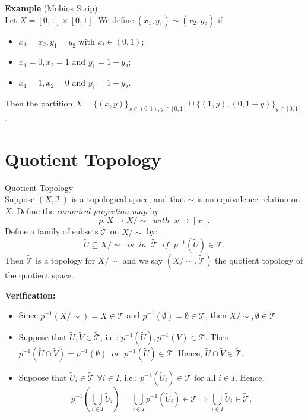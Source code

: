\noindent \textbf{Example} (Mobius Strip):\\
Let $X = [0,1] \times [0,1]$. We define $(x_1,y_1) \sim (x_2,y_2)$ if
\begin{itemize}
    \item $x_1 = x_2, y_1 =y_2$ with $x_i \in (0,1)$;
    \item $x_1 = 0, x_2 = 1$ and $y_1 = 1-y_2$;
    \item $x_1 = 1,x_2=0$ and $y_1=1-y_2$.
\end{itemize}
Then the partition $X = \{ (x,y) \}_{x \in (0,1), y\in [0,1]} \cup \{ (1,y), (0,1-y) \}_{y\in [0,1]}$.

\section{Quotient Topology}

\begin{definition}{Quotient Topology}\\
Suppose $(X,\mathcal{T})$ is a topological space, and that $\sim$ is an equivalence relation on $X$. Define the \textit{canonical projection map} by 
$$p: X\rightarrow X/\sim \;\; with \;\; x \mapsto [x].$$
Define a family of subsets $\widetilde{\mathcal{T}}$ on $X/\sim$ by:
$$\widetilde{U} \subseteq X/\sim \;\; is \;\; in \;\; \widetilde{\mathcal{T}} \;\; if \;\; p^{-1} (\widetilde{U}) \in \mathcal{T}.$$
Then $\widetilde{\mathcal{T}}$ is a topology for $X/\sim$ and we say $(X/\sim,\widetilde{\mathcal{T}})$ the quotient topology of the quotient space.
\end{definition}

\noindent\textbf{Verification:}
\begin{itemize}
    \item Since $p^{-1}(X/\sim) = X \in \mathcal{T}$ and $p^{-1} ( \emptyset) =\emptyset \in \mathcal{T}$, then $X/\sim ,\emptyset \in \widetilde{\mathcal{T}}$.
    \item Suppose that $\widetilde{U} , \widetilde{V}\in \widetilde{\mathcal{T}}$, i.e.: $p^{-1}(\widetilde{U}), p^{-1}(V) \in \mathcal{T}$. 
    Then $p^{-1} (\widetilde{U} \cap \widetilde{V}) = p^{-1} ( \emptyset) \;\; or \;\; p^{-1}(\widetilde{U}) \in \mathcal{T}$. 
    Hence, $\widetilde{U} \cap \widetilde{V} \in \widetilde{\mathcal{T}}$.
    \item Suppose that $\widetilde{U}_{i} \in \widetilde{\mathcal{T}}$ $\forall i \in I$, i.e.: $p^{-1}(\widetilde{U}_i) \in \mathcal{T}$ for all $i\in I$.
    Hence, 
    $$p^{-1} (\bigcup _{i\in I} \widetilde{U}_i) = \bigcup_{i\in I} p^{-1} (\widetilde{U}_i) \in \mathcal{T} \Rightarrow \bigcup _{i\in I} \widetilde{U}_i \in \widetilde{\mathcal{T}}.$$
\end{itemize}

